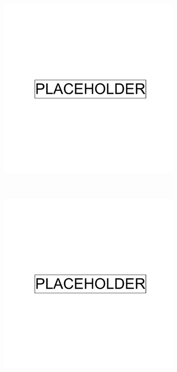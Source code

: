 \begin{figure}[ht]
    \centering
    \begin{subfigure}{0.49\columnwidth}
    \includegraphics[width=\columnwidth]{placeholder.png}
    \caption{}
    \label{fig:supp_umap_hrs_hisp_1kgp_hisp}
    \end{subfigure}\hfill
    \unskip\ \vrule\
        \begin{subfigure}{0.49\columnwidth}
    \includegraphics[width=\columnwidth]{placeholder.png}

\end{subfigure}
\end{figure}
